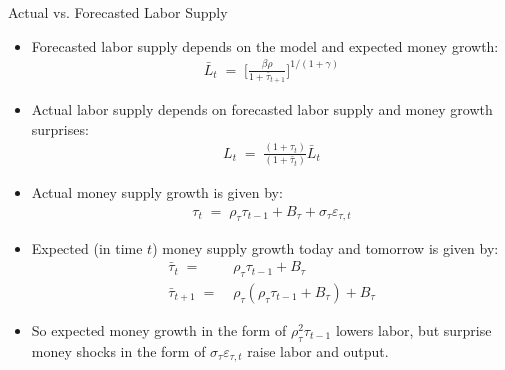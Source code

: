 \documentclass[10pt,c,aspectratio=1610,handout]{beamer}
\begin{document}
\begin{frame}{Actual vs. Forecasted Labor Supply}%
  \begin{itemize}%
    \item[$\blacktriangleright$] Forecasted labor supply depends on the model and expected money growth:%
    \begin{align*}%
      \bar{L}_t \; = \; \Bigg[ \frac{\beta \rho}{1+\bar{\tau}_{t+1}} \Bigg]^{1/(1+\gamma)}%
    \end{align*}%
    \item[$\blacktriangleright$] Actual labor supply depends on forecasted labor supply and money growth surprises:%
    \begin{align*}%
      L_{t} \; = \; \frac{(1+\tau_{t})}{(1+\bar{\tau}_{t})} \bar{L}_{t} \label{NK key 2}%
    \end{align*}%
    \item[$\blacktriangleright$] Actual money supply growth is given by:%
    \begin{align*}%
      \tau_{t} \; = \; \rho_{\tau} \tau_{t-1} + B_{\tau} + \sigma_{\tau} \varepsilon_{\tau ,t}%
    \end{align*}%
    \item[$\blacktriangleright$] Expected (in time $t$) money supply growth today and tomorrow is given by:%
    \begin{align*}%
      \bar{\tau}_{t} \; = & \; \rho_{\tau} \tau_{t-1} + B_{\tau}\\%
      \bar{\tau}_{t+1} \; = & \; \rho_{\tau} (\rho_{\tau} \tau_{t-1} + B_{\tau}) + B_{\tau}%
    \end{align*}%
    \item[$\Rightarrow$] So expected money growth in the form of $\rho_{\tau}^2 \tau_{t-1}$ lowers labor, but surprise money shocks in the form of $\sigma_{\tau}\varepsilon_{\tau ,t}$ raise labor and output.%
  \end{itemize}%
\end{frame}%
\end{document}
